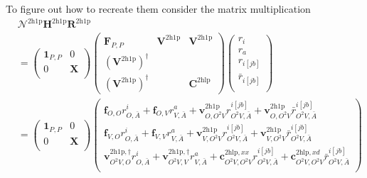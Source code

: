 \begin{tcolorbox}[colback=red!10!white, colframe=red!50!black, title=It is unclear where these equations come from]
\end{tcolorbox}

To figure out how to recreate them consider the matrix multiplication
\begin{align}
&\bm{\mathcal{N}}^{2\mathrm{h1p}} \bm{H}^{2\mathrm{h1p}} \bm{R}^{2\mathrm{h1p}} \\
&= \begin{pmatrix}
\bm{1}_{P,P} & 0 \\
0 & \bm{X} \\
\end{pmatrix}
\begin{pmatrix}
\bm{F}_{P,P} & \bm{V}^{2\mathrm{h1p}} & \bm{V}^{2\mathrm{h1p}} \\
\left(\bm{V}^{2\mathrm{h1p}}\right)^{\dagger} &  &  \\
\left(\bm{V}^{2\mathrm{h1p}}\right)^{\dagger} &  & \bm{C}^{2\mathrm{hlp}}
\end{pmatrix}
\begin{pmatrix}
r_i \\
r_a \\
r_{i[j b]} \\
\bar{r}_{i[j b]} \\
\end{pmatrix}\\
&= \begin{pmatrix}
\bm{1}_{P,P} & 0 \\
0 & \bm{X} \\
\end{pmatrix}
\begin{pmatrix}
\bm{f}_{O,O}r^i_{O,\bar{A}} + \bm{f}_{O,V}r^a_{V,\bar{A}} + \bm{v}^{2\mathrm{h1p}}_{O,O^2V} r^{i[j b]}_{O^2V, \bar{A}} + \bm{v}^{2\mathrm{h1p}}_{O,O^2V} \bar{r}^{i[j b]}_{O^2V, \bar{A}} \\
\bm{f}_{V,O}r^i_{O,\bar{A}} + \bm{f}_{V,V}r^a_{V,\bar{A}} + \bm{v}^{2\mathrm{h1p}}_{V,O^2V} r^{i[j b]}_{O^2V, \bar{A}} + \bm{v}^{2\mathrm{h1p}}_{V,O^2V} \bar{r}^{i[j b]}_{O^2V, \bar{A}} \\
\bm{v}^{2\mathrm{h1p},\dagger}_{O^2V,O} r^i_{O,\bar{A}} + \bm{v}^{2\mathrm{h1p},\dagger}_{O^2V,V} r^a_{V,\bar{A}} + \bm{c}^{2\mathrm{hlp},xx}_{O^2V,O^2V} r^{i[j b]}_{O^2V, \bar{A}} + \bm{c}^{2\mathrm{hlp},xd}_{O^2V,O^2V} \bar{r}^{i[j b]}_{O^2V, \bar{A}} \\

\end{pmatrix}
\end{align}
